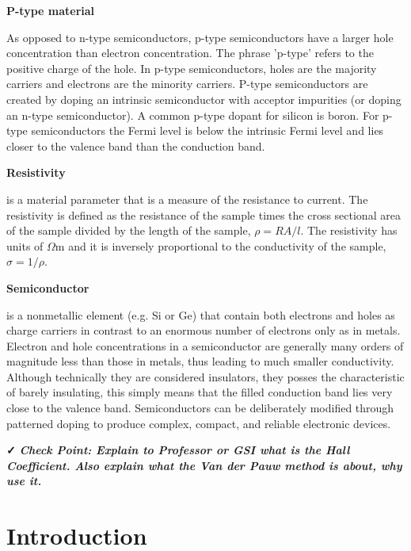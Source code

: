 \documentclass{../lab}
\begin{document}
\textbf{P-type material}

As opposed to n-type semiconductors, p-type semiconductors have a larger hole concentration than electron concentration. The phrase 'p-type' refers to the positive charge of the hole. In p-type semiconductors, holes are the majority carriers and electrons are the minority carriers. P-type semiconductors are created by doping an intrinsic semiconductor with acceptor impurities (or doping an n-type semiconductor). A common p-type dopant for silicon is boron. For p-type semiconductors the Fermi level is below the intrinsic Fermi level and lies closer to the valence band than the conduction band.

\textbf{Resistivity}

is a material parameter that is a measure of the resistance to current. The resistivity is defined as the resistance of the sample times the cross sectional area of the sample divided by the length of the sample, $\rho = RA/l$. The resistivity has units of $\Omega$m and it is inversely proportional to the conductivity of the sample, $\sigma = 1/\rho$.

\textbf{Semiconductor}

is a nonmetallic element (e.g. Si or Ge) that contain both electrons and holes as charge carriers in contrast to an enormous number of electrons only as in metals. Electron and hole concentrations in a semiconductor are generally many orders of magnitude less than those in metals, thus leading to much smaller conductivity. Although technically they are considered insulators, they posses the characteristic of barely insulating, this simply means that the filled conduction band lies very close to the valence band. Semiconductors can be deliberately modified through patterned doping to produce complex, compact, and reliable electronic devices.

\textbf{✓ }\emph{\textbf{Check Point: Explain to Professor or GSI what is the Hall Coefficient.  Also explain what the Van der Pauw method is about, why use it.}}

\section{Introduction}
\end{document}
